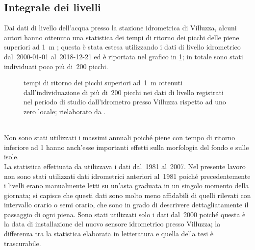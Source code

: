 \subsection{Integrale dei livelli}
Dai dati di livello dell'acqua presso la stazione idrometrica di Villuzza, alcuni autori hanno ottenuto una statistica dei tempi di ritorno dei picchi delle piene superiori ad \SI{1}{\m} ; questa è stata estesa utilizzando i dati di livello idrometrico dal~2000-01-01 al~2018-12-21 ed è riportata nel grafico in \cref{graph:tr-picchi}; in totale sono stati individuati poco più di~200 picchi.
%
\begin{figure}
	\centering
	
	\caption[tempi di ritorno dei picchi superiori ad \SI{1}{\m}]{tempi di ritorno dei picchi superiori ad~\SI{1}{\m} ottenuti dall'individuazione di più di~200 picchi nei dati di livello registrati nel periodo di studio dall'idrometro presso Villuzza rispetto ad uno zero locale; rielaborato da .}
	\label{graph:tr-picchi}
\end{figure}
%
\\
Non sono stati utilizzati i massimi annuali poiché piene con tempo di ritorno inferiore ad \SI{1}{\anno} hanno anch'esse importanti effetti sulla morfologia del fondo e sulle isole.
\\
La statistica effettuata da  utilizzava i dati dal~1981 al~2007.
Nel presente lavoro non sono stati utilizzati dati idrometrici anteriori al~1981 poiché precedentemente i livelli erano manualmente letti su un'asta graduata in un singolo momento della giornata; si capisce che questi dati sono molto meno affidabili di quelli rilevati con intervallo orario o semi orario, che sono in grado di descrivere dettagliatamente il passaggio di ogni piena.
Sono stati utilizzati solo i dati dal~2000 poiché questa è la data di installazione del nuovo sensore idrometrico presso Villuzza; la differenza tra la statistica elaborata in letteratura e quella della tesi è trascurabile.

